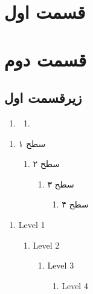 \documentclass[]{article}
\begin{document}
    
    \tableofcontents
    
    \section{قسمت اول}
    \section{قسمت دوم}
    \subsection{زیرقسمت اول}
    \begin{enumerate}
        \item 
        \begin{enumerate}
            \item 
        \end{enumerate}
    \end{enumerate}
    
 \begin{enumerate}
     \item 
     سطح ۱
     \begin{enumerate}
         \item 
         سطح ۲
         \begin{enumerate}
             \item 
             سطح ۳
             \begin{enumerate}
                 \item 
                 سطح ۴
             \end{enumerate}
         \end{enumerate}
     \end{enumerate}
 \end{enumerate}
 
 \begin{enumerate}
     \item Level 1
     \begin{enumerate}
         \item Level 2
         \begin{enumerate}
             \item Level 3
             \begin{enumerate}
                 \item 
                 Level 4
             \end{enumerate}
         \end{enumerate}
     \end{enumerate}
 \end{enumerate}
\end{document}

